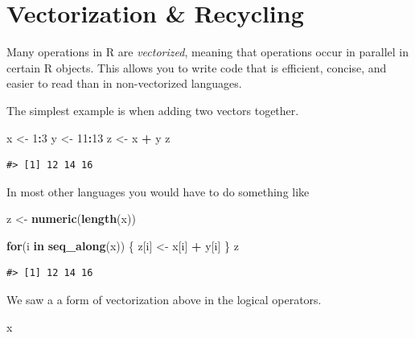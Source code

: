 \documentclass[]{book}
\newenvironment{Shaded}{\begin{snugshade}}{\end{snugshade}}
\newcommand{\KeywordTok}[1]{\textcolor[rgb]{0.13,0.29,0.53}{\textbf{#1}}}
\newcommand{\DecValTok}[1]{\textcolor[rgb]{0.00,0.00,0.81}{#1}}
\newcommand{\StringTok}[1]{\textcolor[rgb]{0.31,0.60,0.02}{#1}}
\newcommand{\ControlFlowTok}[1]{\textcolor[rgb]{0.13,0.29,0.53}{\textbf{#1}}}
\newcommand{\OperatorTok}[1]{\textcolor[rgb]{0.81,0.36,0.00}{\textbf{#1}}}
\newcommand{\NormalTok}[1]{#1}
\theoremstyle{definition}
\theoremstyle{definition}
\theoremstyle{definition}
\theoremstyle{remark}
\begin{document}
\section{Vectorization \& Recycling}\label{vectorization-recycling}

Many operations in R are \emph{vectorized}, meaning that operations
occur in parallel in certain R objects. This allows you to write code
that is efficient, concise, and easier to read than in non-vectorized
languages.

The simplest example is when adding two vectors together.

\begin{Shaded}
\begin{Highlighting}[]
\NormalTok{x <-}\StringTok{ }\DecValTok{1}\OperatorTok{:}\DecValTok{3}
\NormalTok{y <-}\StringTok{ }\DecValTok{11}\OperatorTok{:}\DecValTok{13}
\NormalTok{z <-}\StringTok{ }\NormalTok{x }\OperatorTok{+}\StringTok{ }\NormalTok{y}
\NormalTok{z}
\end{Highlighting}
\end{Shaded}

\begin{verbatim}
#> [1] 12 14 16
\end{verbatim}

In most other languages you would have to do something like

\begin{Shaded}
\begin{Highlighting}[]
\NormalTok{z <-}\StringTok{ }\KeywordTok{numeric}\NormalTok{(}\KeywordTok{length}\NormalTok{(x))}

\ControlFlowTok{for}\NormalTok{(i }\ControlFlowTok{in} \KeywordTok{seq_along}\NormalTok{(x)) \{}
\NormalTok{      z[i] <-}\StringTok{ }\NormalTok{x[i] }\OperatorTok{+}\StringTok{ }\NormalTok{y[i]}
\NormalTok{\}}
\NormalTok{z}
\end{Highlighting}
\end{Shaded}

\begin{verbatim}
#> [1] 12 14 16
\end{verbatim}

We saw a a form of vectorization above in the logical operators.

\begin{Shaded}
\begin{Highlighting}[]
\NormalTok{x}
\end{Highlighting}
\end{Shaded}
\end{document}
